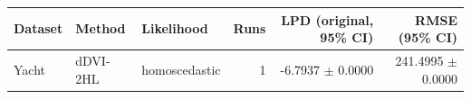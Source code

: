 \begin{tabular}{lllrrr}
\toprule
Dataset & Method & Likelihood & Runs & LPD (original, 95\% CI) & RMSE (95\% CI) \\
\midrule
Yacht & dDVI-2HL & homoscedastic & 1 & -6.7937 $\pm$ 0.0000 & 241.4995 $\pm$ 0.0000 \\
\bottomrule
\end{tabular}
